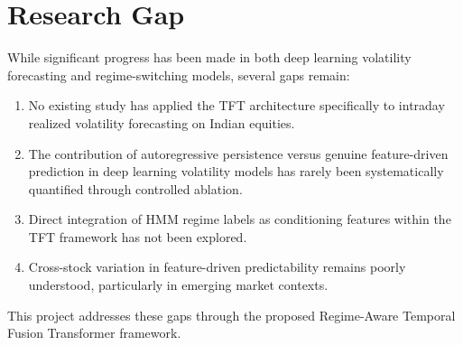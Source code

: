 \section{Research Gap}

While significant progress has been made in both deep learning volatility forecasting and regime-switching models, several gaps remain:

\begin{enumerate}
    \item No existing study has applied the TFT architecture specifically to intraday realized volatility forecasting on Indian equities.
    \item The contribution of autoregressive persistence versus genuine feature-driven prediction in deep learning volatility models has rarely been systematically quantified through controlled ablation.
    \item Direct integration of HMM regime labels as conditioning features within the TFT framework has not been explored.
    \item Cross-stock variation in feature-driven predictability remains poorly understood, particularly in emerging market contexts.
\end{enumerate}

This project addresses these gaps through the proposed Regime-Aware Temporal Fusion Transformer framework.

